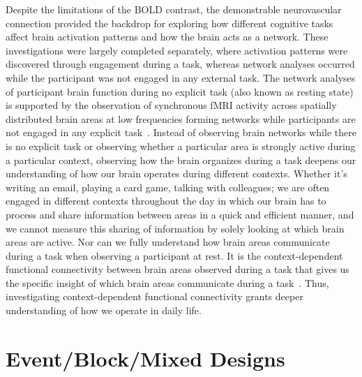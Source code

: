 \documentclass[phd,appendix,figures]{uithesis}
\begin{document}
Despite the limitations of the BOLD contrast, the demonstrable neurovascular 
connection provided the backdrop for exploring how different
cognitive tasks affect brain activation patterns and how the brain acts as a
network.
These investigations were largely completed separately, where activation patterns
were discovered through engagement during a task, whereas network analyses
occurred while the participant was not engaged in any external task.
The network analyses of participant brain function during no explicit task
(also known as resting state) is supported by the observation of synchronous fMRI activity
across spatially distributed brain areas at low frequencies forming networks while
participants are not engaged in any explicit task~\cite{Greicius2003,Raichle2009}.
Instead of observing brain networks while there is no explicit task or observing
whether a particular area is strongly active during a particular context,
observing how the brain organizes during a task deepens our understanding of how
our brain operates during different contexts.
Whether it's writing an email, playing a card game, talking with colleagues; we are
often engaged in different contexts throughout the day in which our brain has to process
and share information between areas in a quick and efficient manner, and we cannot
measure this sharing of information by solely looking at which brain areas are active.
Nor can we fully understand how brain areas communicate during a task when observing a
participant at rest.
It is the context-dependent functional connectivity between brain areas observed during a task
that gives us the specific insight of which brain areas communicate during a task~\cite{Friston1997}.
Thus, investigating context-dependent functional connectivity grants deeper understanding
of how we operate in daily life.

\section{Event/Block/Mixed Designs}
\end{document}
